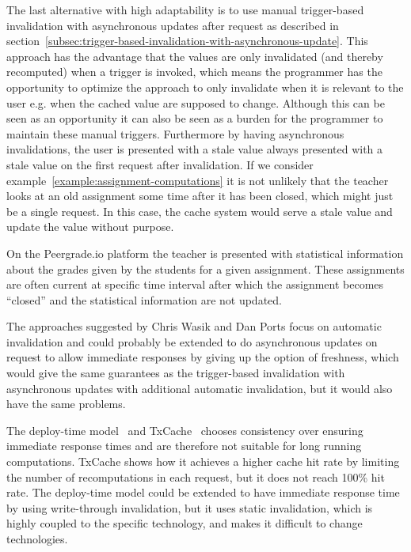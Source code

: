 The last alternative with high adaptability is to use manual trigger-based invalidation with asynchronous updates after request as described in section~\ref{subsec:trigger-based-invalidation-with-asynchronous-update}. This approach has the advantage that the values are only invalidated (and thereby recomputed) when a trigger is invoked, which means the programmer has the opportunity to optimize the approach to only invalidate when it is relevant to the user e.g. when the cached value are supposed to change. Although this can be seen as an opportunity it can also be seen as a burden for the programmer to maintain these manual triggers. Furthermore by having asynchronous invalidations, the user is presented with a stale value always presented with a stale value on the first request after invalidation. If we consider example~\ref{example:assignment-computations} it is not unlikely that the teacher looks at an old assignment some time after it has been closed, which might just be a single request. In this case, the cache system would serve a stale value and update the value without purpose.
\begin{example}
\label{example:assignment-computations}
On the Peergrade.io platform the teacher is presented with statistical information about the grades given by the students for a given assignment. These assignments are often current at specific time interval after which the assignment becomes ``closed'' and the statistical information are not updated.
\end{example}
The approaches suggested by Chris Wasik and Dan Ports focus on automatic invalidation and could probably be extended to do asynchronous updates on request to allow immediate responses by giving up the option of freshness, which would give the same guarantees as the trigger-based invalidation with asynchronous updates with additional automatic invalidation, but it would also have the same problems.

The deploy-time model~\cite{paper:deploy-time} and TxCache~\cite{paper:liskov} chooses consistency over ensuring immediate response times and are therefore not suitable for long running computations. TxCache shows how it achieves a higher cache hit rate by limiting the number of recomputations in each request, but it does not reach 100\% hit rate. The deploy-time model could be extended to have immediate response time by using write-through invalidation, but it uses static invalidation, which is highly coupled to the specific technology, and makes it difficult to change technologies.

